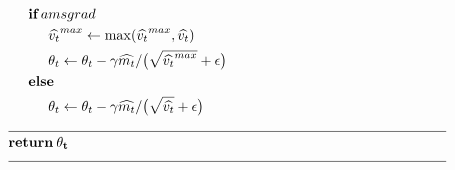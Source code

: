 \documentclass[]{article}
\begin{document}
\begin{align}
&\hspace{5mm}\textbf{if} \: amsgrad                                                  \\
&\hspace{10mm}\widehat{v_t}^{max} \leftarrow \mathrm{max}(\widehat{v_t}^{max},
    \widehat{v_t})                                                                   \\
&\hspace{10mm}\theta_t \leftarrow \theta_t - \gamma \widehat{m_t}/
    \big(\sqrt{\widehat{v_t}^{max}} + \epsilon \big)                                 \\
&\hspace{5mm}\textbf{else}                                                           \\
&\hspace{10mm}\theta_t \leftarrow \theta_t - \gamma \widehat{m_t}/
    \big(\sqrt{\widehat{v_t}} + \epsilon \big)                                       \\
&\rule{110mm}{0.4pt}                                                          \\[-1.ex]
&\bf{return} \:  \theta_t                                                     \\[-1.ex]
&\rule{110mm}{0.4pt}                                                          \\[-1.ex]
\end{align}
\end{document}
